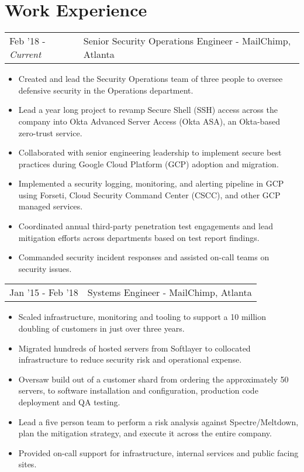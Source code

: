\documentclass[letterpaper]{article}
\begin{document}
\section*{Work Experience}
\begin{tabular}{l|l}
{Feb '18 - \emph{Current}} & Senior Security Operations Engineer - MailChimp, Atlanta\\
\end{tabular}
\begin{itemize}[itemsep=0.5pt]
	\item Created and lead the Security Operations team of three people to oversee defensive security in the Operations department.
	\item Lead a year long project to revamp Secure Shell (SSH) access across the company into Okta Advanced Server Access (Okta ASA), an Okta-based zero-trust service. 
	\item Collaborated with senior engineering leadership to implement secure best practices during Google Cloud Platform (GCP) adoption and migration.
	\item Implemented a security logging, monitoring, and alerting pipeline in GCP using Forseti, Cloud Security Command Center (CSCC), and other GCP managed services.
	\item Coordinated annual third-party penetration test engagements and lead mitigation efforts across departments based on test report findings.
	\item Commanded security incident responses and assisted on-call teams on security issues.
\end{itemize}
\begin{tabular}{l|l}
{Jan '15 - Feb '18} & Systems Engineer - MailChimp, Atlanta\\
\end{tabular}
\begin{itemize}[itemsep=0.5pt]
	\item Scaled infrastructure, monitoring and tooling to support a 10 million doubling of customers in just over three years.
	\item Migrated hundreds of hosted servers from Softlayer to collocated infrastructure to reduce security risk and operational expense.
	\item Oversaw build out of a customer shard from ordering the approximately 50 servers, to software installation and configuration, production code deployment and QA testing.
	\item Lead a five person team to perform a risk analysis against Spectre/Meltdown, plan the mitigation strategy, and execute it across the entire company.
	\item Provided on-call support for infrastructure, internal services and public facing sites.
\end{itemize}
\end{document}
